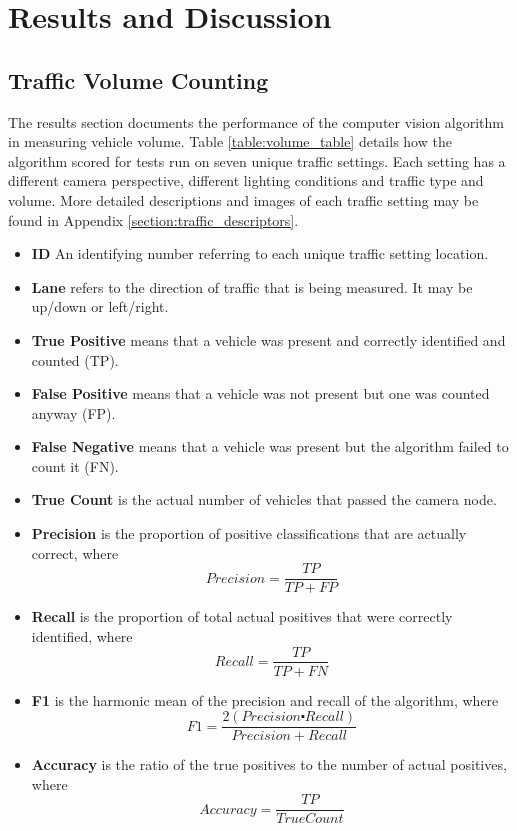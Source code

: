 \chapter{Results and Discussion}

\section{Traffic Volume Counting}

The results section documents the performance of the computer vision algorithm in measuring vehicle volume. Table \ref{table:volume_table} details how the algorithm scored for tests run on seven unique traffic settings. Each setting has a different camera perspective, different lighting conditions and traffic type and volume. More detailed descriptions and images of each traffic setting may be found in Appendix \ref{section:traffic_descriptors}.

\begin{itemize}
\item\textbf{ID} An identifying number referring to each unique traffic setting location.
\item\textbf{Lane} refers to the direction of traffic that is being measured. It may be up/down or left/right.
\item\textbf{True Positive} means that a vehicle was present and correctly identified and counted (TP).
\item\textbf{False Positive} means that a vehicle was not present but one was counted anyway (FP).
\item\textbf{False Negative} means that a vehicle was present but the algorithm failed to count it (FN).
\item\textbf{True Count} is the actual number of vehicles that passed the camera node. 
\item\textbf{Precision} is the proportion of positive classifications that are actually correct, where \[Precision = \frac{TP}{TP + FP}\]
\item\textbf{Recall} is the proportion of total actual positives that were correctly identified, where \[Recall = \frac{TP}{TP + FN}\]
\item\textbf{F1} is the harmonic mean of the precision and recall of the algorithm, where \[F1 = \frac{2(Precision \centerdot Recall)}{Precision + Recall}\]
\item\textbf{Accuracy} is the ratio of the true positives to the number of actual positives, where \[Accuracy = \frac{TP}{True Count}\]
\end{itemize}



